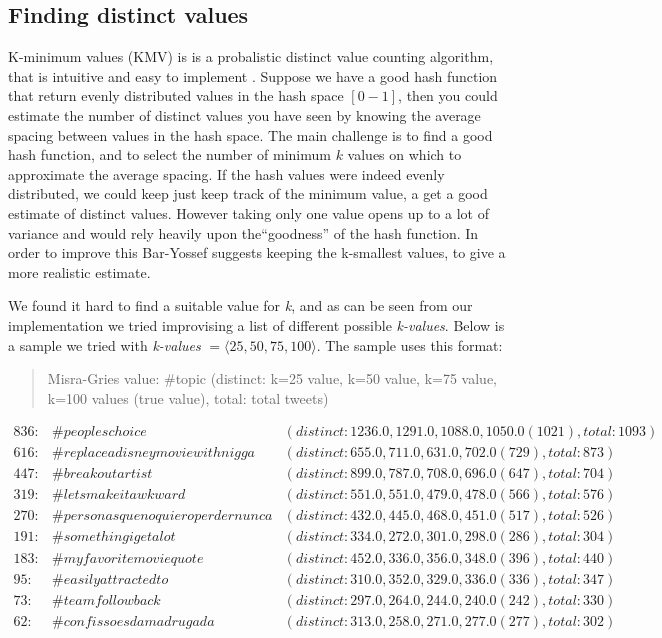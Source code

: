 

\subsection{Finding distinct values}\label{algo-distinct}
K-minimum values (KMV) is is a probalistic distinct value counting algorithm, that is intuitive and easy to implement \cite{kmv}. Suppose we have a good hash function that return evenly distributed values in the hash space $[0-1]$, then you could estimate the number of distinct values you have seen by knowing the average spacing between values in the hash space. The main challenge is to find a good hash function, and to select the number of minimum $k$ values on which to approximate the average spacing. If the hash values were indeed evenly distributed, we could keep just keep track of the minimum value, a get a good estimate of distinct values. However taking only one value opens up to a lot of variance and would rely heavily upon the``goodness'' of the hash function. In order to improve this Bar-Yossef\cite{Bar-Yossef} suggests keeping the k-smallest values, to give a more realistic estimate.

We found it hard to find a suitable value for \textit{k}, and as can be seen from our implementation we tried improvising a list of different possible \textit{k-values}. Below is a sample we tried with \textit{k-values} $= \langle 25, 50, 75, 100 \rangle$. The sample uses this format:
\begin{quote}
    Misra-Gries value: \#topic (distinct: k=25 value, k=50 value, k=75 value, k=100 values (true value), total: total tweets)
\end{quote}
{\footnotesize
$\begin{array}{lll}
        836: & \#peopleschoice & (distinct: 1236.0,1291.0,1088.0,1050.0 (1021), total: 1093) \\
        616: & \#replaceadisneymoviewithnigga & (distinct: 655.0,711.0,631.0,702.0 (729), total: 873) \\
        447: & \#breakoutartist & (distinct: 899.0,787.0,708.0,696.0 (647), total: 704) \\
        319: & \#letsmakeitawkward & (distinct: 551.0,551.0,479.0,478.0 (566), total: 576) \\
        270: & \#personasquenoquieroperdernunca & (distinct: 432.0,445.0,468.0,451.0 (517), total: 526) \\
        191: & \#somethingigetalot & (distinct: 334.0,272.0,301.0,298.0 (286), total: 304) \\
        183: & \#myfavoritemoviequote & (distinct: 452.0,336.0,356.0,348.0 (396), total: 440) \\
        95: & \#easilyattractedto & (distinct: 310.0,352.0,329.0,336.0 (336), total: 347) \\
        73: & \#teamfollowback & (distinct: 297.0,264.0,244.0,240.0 (242), total: 330) \\
        62: & \#confissoesdamadrugada & (distinct: 313.0,258.0,271.0,277.0 (277), total: 302) \\
\end{array}$}

